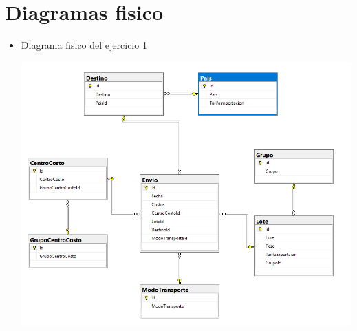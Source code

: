 \section{Diagramas fisico} 

\begin{itemize}
	\item Diagrama fisico del ejercicio 1
	\\
	\begin{center}
	\includegraphics[width=13cm]{./Imagenes/mf_ejer1} 
	\end{center}



\end{itemize} 
